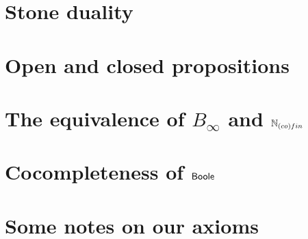 \documentclass{../util/zariski}
\begin{document}
\section{Stone duality}




\section{Open and closed propositions}

%
%



\appendix
\section{The equivalence of $B_\infty$ and $\mathbb{N}_{(co)fin}$}


\section{Cocompleteness of $\mathsf{Boole}$}

\section{Some notes on our axioms}
\label{NotesOnAxioms}


%
\end{document}
